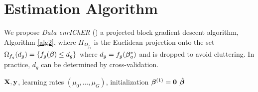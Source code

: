 
\section{Estimation Algorithm}
\label{sec:opt}
We propose \emph{Data enrIChER} (\dc) a projected block gradient descent algorithm, Algorithm \ref{alg2}, where $\Pi_{\Omega_{f_g}}$ is the Euclidean projection onto the set $\Omega_{f_g}(d_g) = \{f_g(\boldsymbol{\beta}) \leq d_g\}$ where $d_g = f_g(\boldsymbol{\beta}_g^*)$ and is dropped to avoid cluttering. In practice, $d_g$ can be determined by cross-validation.

\begin{algorithm}[t]
	\caption{  \dc }
	\label{alg2}
	\begin{algorithmic}[1]
		 $\mathbf{X}, \mathbf{y}$, learning rates $(\mu_0, \dots, \mu_G)$, initialization $\boldsymbol{\beta} ^{(1)} = \mathbf{0}$
		 $\hat{\boldsymbol{\beta}}$
		\ENDFOR
		\ENDFOR
	\end{algorithmic}
\end{algorithm}




